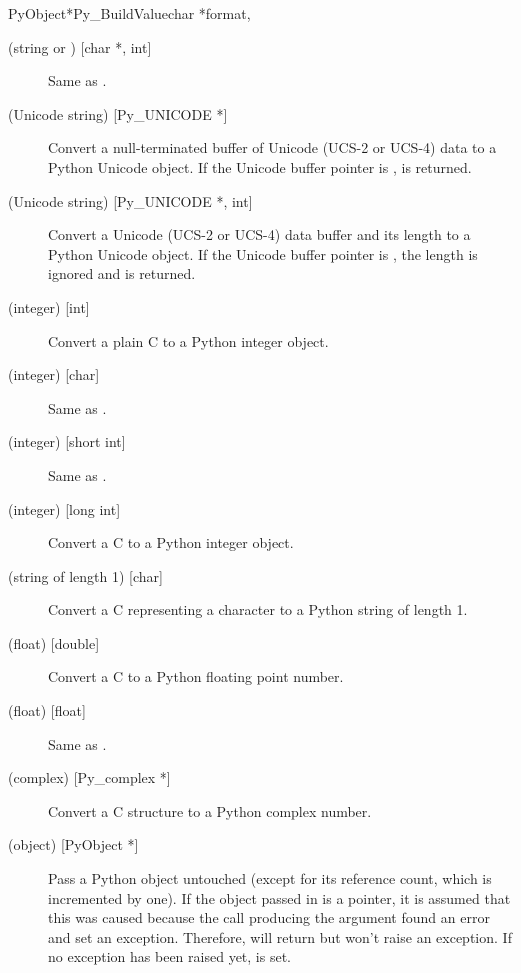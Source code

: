 \begin{cfuncdesc}{PyObject*}{Py_BuildValue}{char *format,
                                            \moreargs}
\begin{description}
    \item[ (string or ) {[char *, int]}]
    Same as .

    \item[ (Unicode string) {[Py_UNICODE *]}]
    Convert a null-terminated buffer of Unicode (UCS-2 or UCS-4)
    data to a Python Unicode object.  If the Unicode buffer pointer
    is \NULL,  is returned.

    \item[ (Unicode string) {[Py_UNICODE *, int]}]
    Convert a Unicode (UCS-2 or UCS-4) data buffer and its length
    to a Python Unicode object.   If the Unicode buffer pointer
    is \NULL, the length is ignored and  is returned.

    \item[ (integer) {[int]}]
    Convert a plain C  to a Python integer object.

    \item[ (integer) {[char]}]
    Same as .

    \item[ (integer) {[short int]}]
    Same as .

    \item[ (integer) {[long int]}]
    Convert a C  to a Python integer object.

    \item[ (string of length 1) {[char]}]
    Convert a C  representing a character to a Python
    string of length 1.

    \item[ (float) {[double]}]
    Convert a C  to a Python floating point number.

    \item[ (float) {[float]}]
    Same as .

    \item[ (complex) {[Py_complex *]}]
    Convert a C  structure to a Python complex
    number.

    \item[ (object) {[PyObject *]}]
    Pass a Python object untouched (except for its reference count,
    which is incremented by one).  If the object passed in is a
    \NULL{} pointer, it is assumed that this was caused because the
    call producing the argument found an error and set an exception.
    Therefore,  will return \NULL{} but
    won't raise an exception.  If no exception has been raised yet,
     is set.


\end{description}
\end{cfuncdesc}

